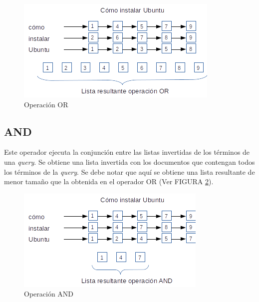 \begin{figure}[tp]
\centering
\includegraphics[scale=.75]{images/ORoperation.png}
\caption{Operaci\'on OR}
\label{fig:ORoperation}
\end{figure}

\subsection{AND}
\label{marco:and}
Este operador ejecuta la conjunción entre las listas invertidas de los términos de una \textit{query}. Se obtiene una lista invertida con los documentos que contengan todos los términos de la \textit{query}. Se debe notar que aquí se obtiene una lista resultante de menor tamaño que la obtenida en el operador OR (Ver FIGURA \ref{fig:ANDoperation}).

\begin{figure}[tp]
\centering
\includegraphics[scale=.75]{images/ANDoperation.png}
\caption{Operaci\'on AND}
\label{fig:ANDoperation}
\end{figure}


